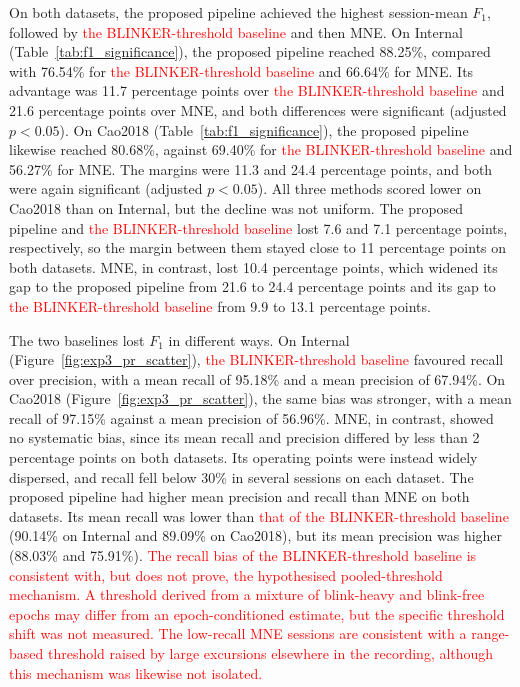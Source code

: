 \documentclass[journal,twoside,web]{ieeecolor}
\newcommand{\rev}[1]{\textcolor{red}{#1}}
\begin{document}
%
On both datasets, the proposed pipeline achieved the highest session-mean $F_1$, followed by \rev{the BLINKER-threshold baseline} and then MNE. On Internal (Table~\ref{tab:f1_significance}), the proposed pipeline reached 88.25\%, compared with 76.54\% for \rev{the BLINKER-threshold baseline} and 66.64\% for MNE. Its advantage was 11.7 percentage points over \rev{the BLINKER-threshold baseline} and 21.6 percentage points over MNE, and both differences were significant (adjusted $p < 0.05$). On Cao2018 (Table~\ref{tab:f1_significance}), the proposed pipeline likewise reached 80.68\%, against 69.40\% for \rev{the BLINKER-threshold baseline} and 56.27\% for MNE. The margins were 11.3 and 24.4 percentage points, and both were again significant (adjusted $p < 0.05$). All three methods scored lower on Cao2018 than on Internal, but the decline was not uniform. The proposed pipeline and \rev{the BLINKER-threshold baseline} lost 7.6 and 7.1 percentage points, respectively, so the margin between them stayed close to 11 percentage points on both datasets. MNE, in contrast, lost 10.4 percentage points, which widened its gap to the proposed pipeline from 21.6 to 24.4 percentage points and its gap to \rev{the BLINKER-threshold baseline} from 9.9 to 13.1 percentage points.
 
%
The two baselines lost $F_1$ in different ways. On Internal (Figure~\ref{fig:exp3_pr_scatter}), \rev{the BLINKER-threshold baseline} favoured recall over precision, with a mean recall of 95.18\% and a mean precision of 67.94\%. On Cao2018 (Figure~\ref{fig:exp3_pr_scatter}), the same bias was stronger, with a mean recall of 97.15\% against a mean precision of 56.96\%. MNE, in contrast, showed no systematic bias, since its mean recall and precision differed by less than 2 percentage points on both datasets. Its operating points were instead widely dispersed, and recall fell below 30\% in several sessions on each dataset. The proposed pipeline had higher mean precision and recall than MNE on both datasets. Its mean recall was lower than \rev{that of the BLINKER-threshold baseline} (90.14\% on Internal and 89.09\% on Cao2018), but its mean precision was higher (88.03\% and 75.91\%). %
\rev{The recall bias of the BLINKER-threshold baseline is consistent with, but does not prove, the hypothesised pooled-threshold mechanism. A threshold derived from a mixture of blink-heavy and blink-free epochs may differ from an epoch-conditioned estimate, but the specific threshold shift was not measured. The low-recall MNE sessions are consistent with a range-based threshold raised by large excursions elsewhere in the recording, although this mechanism was likewise not isolated.}
%
%
 
\end{document}
